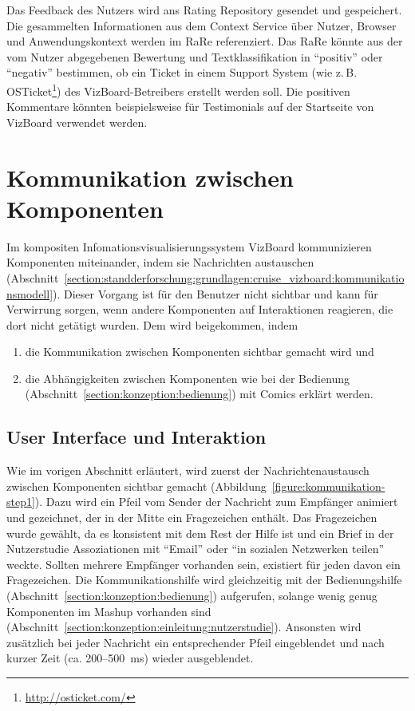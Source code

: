 \documentclass[
	headsepline,
	footsepline,
	fontsize=12pt,
	bibliography=totoc
]{scrbook}
\begin{document}

Das Feedback des Nutzers wird ans Rating Repository gesendet und gespeichert. Die gesammelten Informationen aus dem Context Service über Nutzer, Browser und Anwendungskontext werden im RaRe referenziert. Das RaRe könnte aus der vom Nutzer abgegebenen Bewertung und Textklassifikation \cite{Sebastiani2002} in \enquote{positiv} oder \enquote{negativ} bestimmen, ob ein Ticket in einem Support System (wie z.\,B. OSTicket\footnote{\url{http://osticket.com/}}) des VizBoard-Betreibers erstellt werden soll. Die positiven Kommentare könnten beispielsweise für Testimonials auf der Startseite von VizBoard verwendet werden.

\section{Kommunikation zwischen Komponenten}
\label{section:konzeption:kommunikation}

Im kompositen Infomationsvisualisierungssystem VizBoard kommunizieren Komponenten miteinander, indem sie Nachrichten austauschen (Abschnitt~\ref{section:standderforschung:grundlagen:cruise_vizboard:kommunikationsmodell}). Dieser Vorgang ist für den Benutzer nicht sichtbar und kann für Verwirrung sorgen, wenn andere Komponenten auf Interaktionen reagieren, die dort nicht getätigt wurden. Dem wird beigekommen, indem 

\begin{enumerate}
	\item die Kommunikation zwischen Komponenten sichtbar gemacht wird und
	\item die Abhängigkeiten zwischen Komponenten wie bei der Bedienung (Abschnitt~\ref{section:konzeption:bedienung}) mit Comics erklärt werden.
\end{enumerate}

\subsection{User Interface und Interaktion}
\label{section:konzeption:kommunikation:ui}

Wie im vorigen Abschnitt erläutert, wird zuerst der Nachrichtenaustausch zwischen Komponenten sichtbar gemacht (Abbildung~\ref{figure:kommunikation-step1}). Dazu wird ein Pfeil vom Sender der Nachricht zum Empfänger animiert und gezeichnet, der in der Mitte ein Fragezeichen enthält. Das Fragezeichen wurde gewählt, da es konsistent mit dem Rest der Hilfe ist und ein Brief in der Nutzerstudie Assoziationen mit \enquote{Email} oder \enquote{in sozialen Netzwerken teilen} weckte. Sollten mehrere Empfänger vorhanden sein, existiert für jeden davon ein Fragezeichen. Die Kommunikationshilfe wird gleichzeitig mit der Bedienungshilfe (Abschnitt~\ref{section:konzeption:bedienung}) aufgerufen, solange wenig genug Komponenten im Mashup vorhanden sind (Abschnitt~\ref{section:konzeption:einleitung:nutzerstudie}). Ansonsten wird zusätzlich bei jeder Nachricht ein entsprechender Pfeil eingeblendet und nach kurzer Zeit (ca. 200--500~ms) wieder ausgeblendet.
\end{document}

